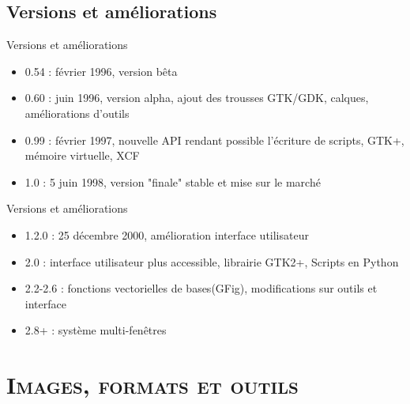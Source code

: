 \documentclass[xcolor=x11names,compress]{beamer}
\renewcommand{\(}{\begin{columns}}
\renewcommand{\)}{\end{columns}}
\newcommand{\<}[1]{\begin{column}{#1}}
\renewcommand{\>}{\end{column}}
\begin{document}
\subsection{Versions et améliorations}
\begin{frame}{Versions et améliorations}
\begin{itemize}
\item 0.54 : février 1996, version bêta
\end{itemize}
\begin{itemize}
\item 0.60 : juin 1996, version alpha, ajout des trousses GTK/GDK, calques, améliorations d'outils
\end{itemize}
\begin{itemize}
\item 0.99 : février 1997, nouvelle API rendant possible l'écriture de scripts, GTK+, mémoire virtuelle, XCF
\end{itemize}
\begin{itemize}
\item 1.0 : 5 juin 1998, version "finale" stable et mise sur le marché
\end{itemize}
\end{frame}

\begin{frame}{Versions et améliorations}
\begin{itemize}
\item 1.2.0 : 25 décembre 2000, amélioration interface utilisateur
\end{itemize}
\begin{itemize}
\item 2.0 : interface utilisateur plus accessible, librairie GTK2+, Scripts en Python
\end{itemize}
\begin{itemize}
\item 2.2-2.6 : fonctions vectorielles de bases(GFig), modifications sur outils et interface
\end{itemize}
\begin{itemize}
\item 2.8+ : système multi-fenêtres
\end{itemize}
\end{frame}

\section{\scshape Images, formats et outils}
\end{document}
